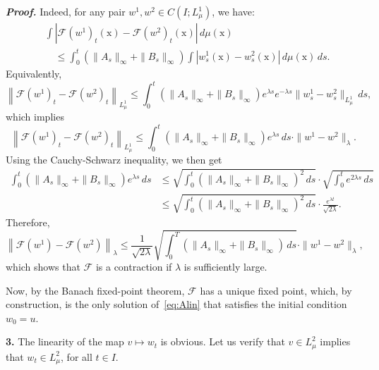 \documentclass[sn-mathphys-num]{sn-jnl}
\numberwithin{equation}{section}
\theoremstyle{mythm}
\theoremstyle{mydef}
\renewenvironment{proof}{\smallskip\noindent\emph{\textbf{Proof.}}%
  \hspace{1pt}}{\hspace{-5pt}{\nobreak\quad\nobreak\hfill\nobreak%
    $\square$\vspace{2pt}\par}\smallskip\goodbreak}
\renewcommand{\d}{\,d}
\begin{document}
\begin{proof}
Indeed, for any pair \( w^1, w^2 \in C(I;L^1_{\mu}) \), we have:
\begin{align*}
&\int \left| \mathcal{F}(w^1)_t(\mathrm{x}) - \mathcal{F}(w^2)_t(\mathrm{x}) \right| \d \mu(\mathrm{x})\\ 
&\quad \le \int_{0}^t \left( \|A_s\|_{\infty} + \|B_s\|_{\infty} \right) \int |w^1_s(\mathrm{x}) - w^2_s(\mathrm{x})| \d \mu(\mathrm{x}) \d s.
\end{align*}
Equivalently,
\[
\left\| \mathcal{F}(w^1)_t - \mathcal{F}(w^2)_t \right\|_{L^1_{\mu}} \le \int_{0}^t \left( \|A_s\|_{\infty} + \|B_s\|_{\infty} \right) e^{\lambda s} e^{-\lambda s} \|w^1_s - w^2_s\|_{L^1_{\mu}} \, ds,
\]
which implies
\[
\left\| \mathcal{F}(w^1)_t - \mathcal{F}(w^2)_t \right\|_{L^1_{\mu}} \le \int_{0}^t \left( \|A_s\|_{\infty} + \|B_s\|_{\infty} \right) e^{\lambda s} \, ds \cdot \|w^1 - w^2\|_{\lambda}.
\]
Using the Cauchy-Schwarz inequality, we then get
\begin{align*}
\int_{0}^t \left( \|A_s\|_{\infty} + \|B_s\|_{\infty} \right) e^{\lambda s} \, ds
&\le \sqrt{\int_{0}^t \left( \|A_s\|_{\infty} + \|B_s\|_{\infty} \right)^2 \, ds} \cdot \sqrt{\int_{0}^t e^{2\lambda s} \, ds} \\
&\le \sqrt{\int_{0}^t \left( \|A_s\|_{\infty} + \|B_s\|_{\infty} \right)^2 \, ds} \cdot \frac{e^{\lambda t}}{\sqrt{2\lambda}}.
\end{align*}
Therefore,
\[
  \left\| \mathcal{F}(w^1) - \mathcal{F}(w^2) \right\|_{\lambda} \le \frac{1}{\sqrt{2\lambda}} \sqrt{\int_{0}^T \left( \|A_s\|_{\infty} + \|B_s\|_{\infty} \right) \, ds} \cdot \|w^1 - w^2\|_{\lambda},
\]
which shows that \( \mathcal{F} \) is a contraction if \( \lambda \) is sufficiently large.

Now, by the Banach fixed-point theorem, \( \mathcal{F} \) has a unique fixed point, which, by construction, is the only solution of~\eqref{eq:Alin} that satisfies the initial condition \( w_0 = u \).


 \textbf{3.} The linearity of the map \( v \mapsto w_t \) is obvious.
 Let us verify that \( v\in {L}^2_{\mu} \) implies that \( w_t\in {L}^2_{\mu} \), for all \( t\in I \).


\end{proof}
\end{document}
